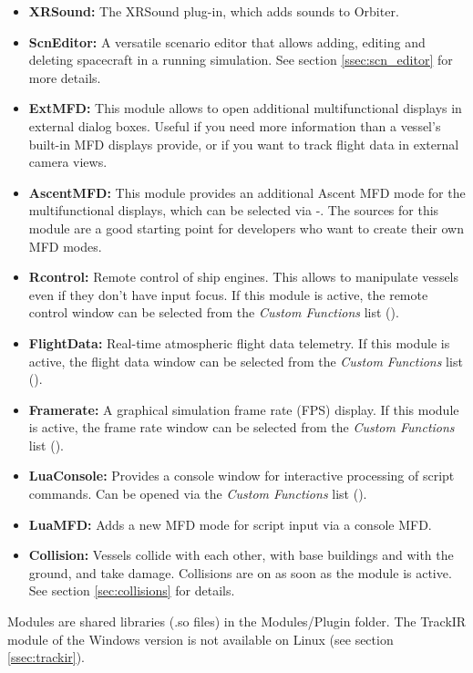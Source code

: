\documentclass[Orbiter User Manual.tex]{subfiles}
\begin{document}
\begin{itemize}
\item \textbf{XRSound:} The XRSound plug-in, which adds sounds to Orbiter.
\item \textbf{ScnEditor:} A versatile scenario editor that allows adding, editing and deleting spacecraft in a running simulation. See section \ref{ssec:scn_editor} for more details.
\item \textbf{ExtMFD:} This module allows to open additional multifunctional displays in external dialog boxes. Useful if you need more information than a vessel's built-in MFD displays provide, or if you want to track flight data in external camera views.
\item \textbf{AscentMFD:} This module provides an additional Ascent MFD mode for the multifunctional displays, which can be selected via \Shift{}-\Shift{}. The sources for this module are a good starting point for developers who want to create their own MFD modes.
\item \textbf{Rcontrol:} Remote control of ship engines. This allows to manipulate vessels even if they don't have input focus. If this module is active, the remote control window can be selected from the \textit{Custom Functions} list (\Ctrl{}).
\item \textbf{FlightData:} Real-time atmospheric flight data telemetry. If this module is active, the flight data window can be selected from the \textit{Custom Functions} list (\Ctrl{}).
\item \textbf{Framerate:} A graphical simulation frame rate (FPS) display. If this module is active, the frame rate window can be selected from the \textit{Custom Functions} list (\Ctrl{}).
\item \textbf{LuaConsole:} Provides a console window for interactive processing of script commands. Can be opened via the \textit{Custom Functions} list (\Ctrl{}).
\item \textbf{LuaMFD:} Adds a new MFD mode for script input via a console MFD.
\item \textbf{Collision:} Vessels collide with each other, with base buildings and with the ground, and take damage. Collisions are on as soon as the module is active. See section \ref{sec:collisions} for details.
\end{itemize}

\noindent
Modules are shared libraries (.so files) in the Modules/Plugin folder. The TrackIR module of the Windows version is not available on Linux (see section \ref{ssec:trackir}).
\end{document}
